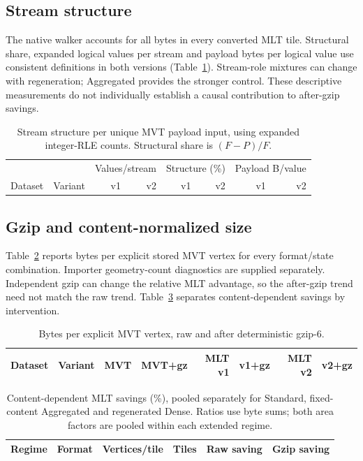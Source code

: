 \subsection{Stream structure}\label{sec:results-streams}
The native walker accounts for all bytes in every converted MLT tile. Structural
share, expanded logical values per stream and payload bytes per logical value use
consistent definitions in both versions (Table~\ref{tab:streams}). Stream-role
mixtures can change with regeneration; Aggregated provides the stronger control.
These descriptive measurements do not individually establish a causal contribution
to after-gzip savings.

\begin{table}[!tp]\centering\footnotesize
\caption{Stream structure per unique MVT payload input, using expanded integer-RLE
counts. Structural share is $(F-P)/F$.}\label{tab:streams}
\begin{tabular}{@{}llrrrrrr@{}}\toprule
& & \multicolumn{2}{c}{Values/stream} & \multicolumn{2}{c}{Structure (\%)} & \multicolumn{2}{c}{Payload B/value}\\
Dataset & Variant & v1 & v2 & v1 & v2 & v1 & v2\\
\midrule\end{tabular}\end{table}

\subsection{Gzip and content-normalized size}\label{sec:results-bpv}
Table~\ref{tab:bpv} reports bytes per explicit stored MVT vertex for every format/state
combination. Importer geometry-count diagnostics are supplied separately. Independent
gzip can change the relative MLT advantage, so the after-gzip trend need not match the
raw trend. Table~\ref{tab:bins} separates content-dependent savings by intervention.

\begin{table}[!tp]\centering\footnotesize
\caption{Bytes per explicit MVT vertex, raw and after deterministic gzip-6.}\label{tab:bpv}
\begin{tabular}{@{}llrrrrrr@{}}\toprule
Dataset & Variant & MVT & MVT+gz & MLT v1 & v1+gz & MLT v2 & v2+gz\\
\midrule\end{tabular}\end{table}

\begin{table}[!tp]\centering\footnotesize
\caption{Content-dependent MLT savings (\%), pooled separately for Standard,
fixed-content Aggregated and regenerated Dense. Ratios use byte sums; both area
factors are pooled within each extended regime.}\label{tab:bins}
\begin{tabular}{@{}lllrrr@{}}\toprule
Regime & Format & Vertices/tile & Tiles & Raw saving & Gzip saving\\
\midrule\end{tabular}\end{table}

